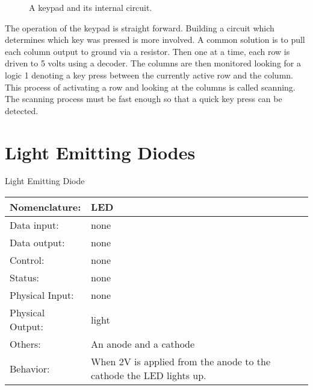                 \begin{figure}[ht]
                    \caption{A keypad and its internal circuit.}
                    \label{fig:commonPeripheralComponentskeypad}
                \end{figure}

                The operation of the keypad is straight forward.  Building a circuit
                which determines which key was pressed is more involved.   A common
                solution is to pull each column output to ground via a resistor.  Then
                one at a time, each row is driven to 5 volts using a decoder.  The
                columns are then monitored looking for a logic 1 denoting a key press
                between the currently active row and the column.  This process
                of activating a row and looking at the columns is called scanning.  The
                scanning process must be fast enough so that a quick key press can be
                detected.

                \section{Light Emitting Diodes}
                    \label{page:led}
                    \begin{buildingblock}{Light Emitting Diode}
                        \begin{tabular}{|l|p{3.5in}|} \hline
                            Nomenclature: & LED \\ \hline
                            Data input:    & none     \\ \hline
                            Data output:   & none    \\ \hline
                            Control:       & none        \\ \hline
                            Status:        & none                                   \\ \hline
                            Physical Input:& none        \\ \hline
                            Physical Output:& light        \\ \hline
                            Others:        & An anode and a cathode                 \\ \hline
                            Behavior:      & When 2V is applied from the anode to the cathode the LED lights
                            up. \\ \hline
                        \end{tabular}
                    \end{buildingblock}


